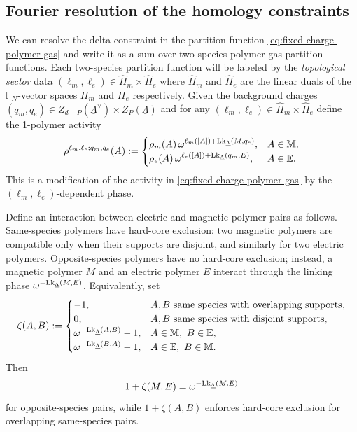 \subsection{Fourier resolution of the homology constraints}
\label{sec:fixed-charge-fourier-resolution}
We can resolve the delta constraint in the partition function \eqref{eq:fixed-charge-polymer-gas} and write it as a sum over two-species polymer gas partition functions. Each two-species partition function will be labeled by the \emph{topological sector} data $(\ell_m,\ell_e) \in \widehat H_m \times \widehat H_e$ where $\widehat H_m$ and $\widehat H_e$ are the linear duals of the $\mathbb F_N$-vector spaces $H_m$ and $H_e$ respectively. Given the background charges $(q_m,q_e) \in Z_{d-P}(\underline\Lambda^\vee) \times Z_P(\underline\Lambda)$ and for any $(\ell_m,\ell_e) \in \widehat H_m \times \widehat H_e$ define the 1-polymer activity
\begin{equation}
	\rho^{\ell_m,\ell_e;q_m,q_e}(A)
	:=
	\begin{cases}
		\rho_m(A)\,
		\omega^{\ell_m([A])+\mathrm{Lk}_{\underline\Lambda}(M,q_e)},
		& A\in \mathbb M ,
		\\
		\rho_e(A)\,
		\omega^{\ell_e([A])+\mathrm{Lk}_{\underline\Lambda}(q_m,E)},
		& A\in \mathbb E .
	\end{cases}
	\label{eq:fixed-background-unified-polymer-activity}
\end{equation}
This is a modification of the activity in \eqref{eq:fixed-charge-polymer-gas} by the $(\ell_m,\ell_e)$-dependent phase.

Define an interaction between electric and magnetic polymer pairs as follows. Same-species polymers have hard-core exclusion:
two magnetic polymers are compatible only when their supports are disjoint, and similarly
for two electric polymers. Opposite-species polymers have no hard-core exclusion; instead,
a magnetic polymer \(M\) and an electric polymer \(E\) interact through the linking phase
\(\omega^{-\mathrm{Lk}_{\underline\Lambda}(M,E)}\). Equivalently, set
\begin{equation}
	\zeta(A,B)
	:=
	\begin{cases}
		-1,
		& A,B \text{ same species with overlapping supports},
		\\
		0,
		& A,B \text{ same species with disjoint supports},
		\\
		\omega^{-\mathrm{Lk}_{\underline\Lambda}(A,B)}-1,
		& A\in \mathbb M ,\ B\in \mathbb E ,
		\\
		\omega^{-\mathrm{Lk}_{\underline\Lambda}(B,A)}-1,
		& A\in \mathbb E ,\ B\in \mathbb M .
	\end{cases}
	\label{eq:zeta}
\end{equation}
Then
\begin{equation}
	1+\zeta(M,E)=\omega^{-\mathrm{Lk}_{\underline\Lambda}(M,E)}
	\label{eq:MEphase}
\end{equation}
for opposite-species pairs, while \(1+\zeta(A,B)\) enforces hard-core exclusion for
overlapping same-species pairs.

